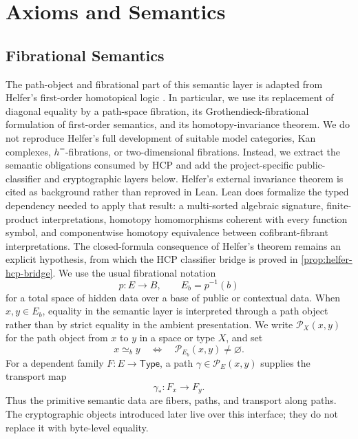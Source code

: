 \section{Axioms and Semantics}\label{sec:mathematical-framework}

\subsection{Fibrational Semantics}

The path-object and fibrational part of this semantic layer is adapted from
Helfer's first-order homotopical logic
\cite[Sections~2--7]{helfer2019fol}. In particular, we use its replacement of
diagonal equality by a path-space fibration, its Grothendieck-fibrational
formulation of first-order semantics, and its homotopy-invariance theorem.
We do not reproduce Helfer's full development of suitable model categories,
Kan complexes, \(h^{=}\)-fibrations, or two-dimensional fibrations. Instead, we
extract the semantic obligations consumed by HCP and add the project-specific
public-classifier and cryptographic layers below. Helfer's external invariance
theorem is cited as background rather than reproved in Lean.
Lean does formalize the typed dependency needed to apply that result: a
multi-sorted algebraic signature, finite-product interpretations, homotopy
homomorphisms coherent with every function symbol, and componentwise
homotopy equivalence between cofibrant-fibrant interpretations. The
closed-formula consequence of Helfer's theorem remains an explicit hypothesis,
from which the HCP classifier bridge is proved in
\cref{prop:helfer-hcp-bridge}.
We use the usual fibrational notation
\[
  p:E\longrightarrow B,
  \qquad
  E_b=p^{-1}(b)
\]
for a total space of hidden data over a base of public or contextual data.
When \(x,y\in E_b\), equality in the semantic layer is interpreted through a
path object rather than by strict equality in the ambient presentation. We
write \(\mathcal P_X(x,y)\) for the path object from \(x\) to \(y\) in a space
or type \(X\), and set
\[
  x\simeq_b y
  \quad\Longleftrightarrow\quad
  \mathcal P_{E_b}(x,y)\neq\varnothing .
\]
For a dependent family \(F:E\to\mathsf{Type}\), a path
\(\gamma\in\mathcal P_E(x,y)\) supplies the transport map
\[
  \gamma_{\ast}:F_x\longrightarrow F_y.
\]
Thus the primitive semantic data are fibers, paths, and transport along paths.
The cryptographic objects introduced later live over this interface; they do
not replace it with byte-level equality.

